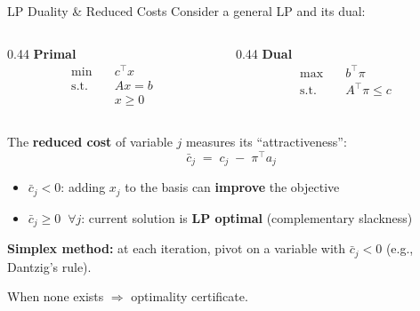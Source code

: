 \documentclass[aspectratio=169]{beamer}
\begin{document}
\begin{frame}{LP Duality \& Reduced Costs}
Consider a general LP and its dual:

\begin{columns}[T]
\begin{column}{0.44\textwidth}
\textbf{Primal}
\vspace{-0.2cm}
\begin{align*}
  \min \quad & c^\top x \\
  \text{s.t.} \quad & Ax = b \\
  & x \ge 0
\end{align*}
\end{column}
\begin{column}{0.44\textwidth}
\textbf{Dual}
\vspace{-0.2cm}
\begin{align*}
  \max \quad & b^\top \pi \\
  \text{s.t.} \quad & A^\top \pi \le c
\end{align*}
\end{column}
\end{columns}

\medskip
The \textbf{reduced cost} of variable $j$ measures its ``attractiveness'':
\[
  \bar{c}_j \;=\; c_j \;-\; \pi^\top a_j
\]

\begin{itemize}
  \item $\bar{c}_j < 0$: adding $x_j$ to the basis can \textbf{improve} the objective
  \item $\bar{c}_j \ge 0 \;\;\forall j$: current solution is \textbf{LP optimal}
        (complementary slackness)
\end{itemize}

\medskip
\textbf{Simplex method:} at each iteration, pivot on a variable with $\bar{c}_j < 0$ (e.g., Dantzig's rule).

When none exists $\Rightarrow$ optimality certificate.
\end{frame}
\end{document}
